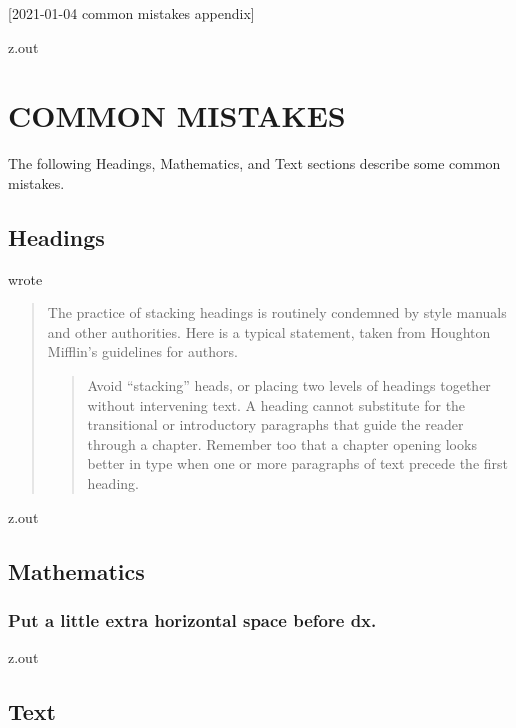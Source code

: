 [2021-01-04 common mistakes appendix]

\begin{VerbatimOut}{z.out}
\chapter{COMMON MISTAKES}

The following Headings, Mathematics, and Text
sections describe some common mistakes.


\section{Headings}

{\textcite[page~289]{farkas2011} }
{\cite{farkas2011} }
wrote

\begin{quotation}
  The practice of stacking headings
  is routinely condemned by style manuals
  and other authorities.
  Here is a typical statement,
  taken from Houghton Mifflin's guidelines for authors.
  \begin{quotation}
    Avoid ``stacking'' heads,
    or placing two levels
    of headings together without intervening text.
    A heading cannot substitute
    for the transitional
    or introductory paragraphs
    that guide the reader through a chapter.
    Remember too that a chapter opening looks better in type
    when one
    or more paragraphs
    of text precede the first heading.
  \end{quotation}
\end{quotation}
\end{VerbatimOut}

\MyIOT

\begin{VerbatimOut}{z.out}


\section{Mathematics}

\subsection{Put a little extra horizontal space before dx.}
\end{VerbatimOut}
\MyIO


\begin{VerbatimOut}{z.out}


\section{Text}
\end{VerbatimOut}

